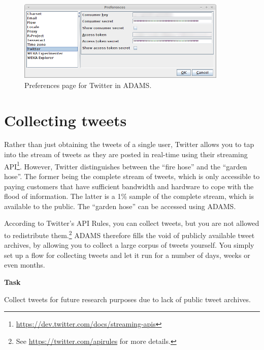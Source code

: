 \documentclass[a4paper,10pt]{book}
\newcommand{\heading}[1]{
  \vspace{0.3cm} \noindent \textbf{#1} \newline
}
\begin{document}
\begin{figure}[htb]
  \centering
  \includegraphics[width=10.0cm]{images/twitter_preferences.png}
  \caption{Preferences page for Twitter in ADAMS.}
  \label{twitter_preferences}
\end{figure}

\clearpage
\newpage
\section{Collecting tweets}
Rather than just obtaining the tweets of a single user, Twitter allows you to tap into the stream of tweets as they are posted in real-time using their streaming API\footnote{\url{https://dev.twitter.com/docs/streaming-apis}{}}. However, Twitter distinguishes between the ``fire hose'' and the ``garden hose''. The former being the complete stream of tweets, which is only accessible to paying customers that have sufficient bandwidth and hardware to cope with the flood of information. The latter is a 1\% sample of the complete stream, which is available to the public. The ``garden hose'' can be accessed using ADAMS.

According to Twitter's API Rules, you can collect tweets, but you are not allowed to redistribute them.\footnote{See \url{https://twitter.com/apirules}{} for more details.} ADAMS therefore fills the void of publicly available tweet archives, by allowing you to collect a large corpus of tweets yourself. You simply set up a flow for collecting tweets and let it run for a number of days, weeks or even months.

\heading{Task}
Collect tweets for future research purposes due to lack of public tweet archives.
\end{document}
